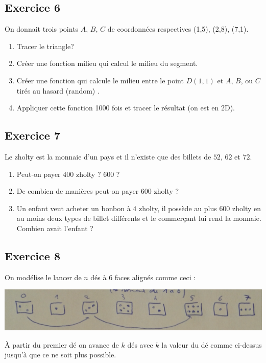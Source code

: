 \documentclass[10pt,fleqn]{article} %
\begin{document}
\begin{multicols}{2}
\subsection*{Exercice 6}
On donnait trois points $A$, $B$, $C$ de coordonnées respectives (1,5), (2,8), (7,1). 
\begin{enumerate}
\item Tracer le triangle?
\item Créer une fonction milieu qui calcul le milieu du segment.
\item Créer une fonction qui calcule le milieu entre le point $D(1,1)$ et $A$, $B$, ou $C$ tirés au hasard (random) .
\item Appliquer cette fonction 1000 fois et tracer le résultat (on est en 2D).
\end{enumerate}


\subsection*{Exercice 7}
Le zholty est la monnaie d'un pays et il n'existe que des billets de 
$52$, $62$ et $72$.
\begin{enumerate}
\item Peut-on payer $400$ zholty ? $600$ ?
\item De combien de manières peut-on payer $600$ zholty ?
\item Un enfant veut acheter un bonbon à $4$ zholty, il possède au plus $600$ zholty en 
au moins deux types de billet différents et le commerçant lui rend la monnaie.
Combien avait l'enfant ?
\end{enumerate}


\subsection*{Exercice 8}

On modélise le lancer de $n$ dés à 6 faces alignés comme ceci : 
\begin{center}
\includegraphics[width=.8\linewidth]{images/exo_2016_5}
\end{center}
À partir du premier dé on avance de $k$ dés avec $k$ la valeur du dé comme ci-dessus jusqu'à que ce ne soit plus possible.


\end{multicols}
\end{document}
